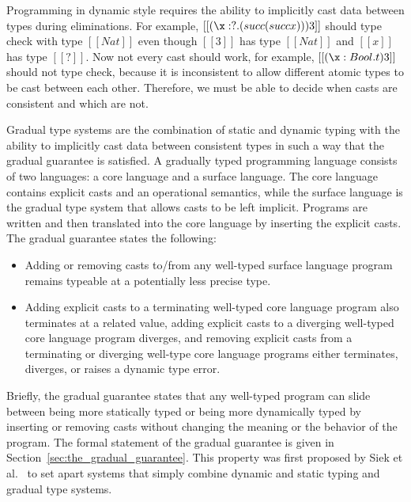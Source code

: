Programming in dynamic style requires the ability to implicitly cast
data between types during eliminations. For example, $[[(\x:?.(succ
    (succ x))) 3]]$ should type check with type $[[Nat]]$ even though
$[[3]]$ has type $[[Nat]]$ and $[[x]]$ has type $[[?]]$. Now not every
cast should work, for example, $[[(\x:Bool.t) 3]]$ should not type check,
because it is inconsistent to allow different atomic types to be cast
between each other.  Therefore, we must be able to decide when casts
are consistent and which are not.

Gradual type systems are the combination of static and dynamic typing
with the ability to implicitly cast data between consistent types in
such a way that the gradual guarantee is satisfied.  A gradually typed
programming language consists of two languages: a core language and a
surface language.  The core language contains explicit casts and an
operational semantics, while the surface language is the gradual type
system that allows casts to be left implicit.  Programs are written
and then translated into the core language by inserting the explicit
casts.  The gradual guarantee states the following:
\begin{itemize}
\item Adding or removing casts to/from any well-typed surface language
  program remains typeable at a potentially less precise type.
\item Adding explicit casts to a terminating well-typed core language
  program also terminates at a related value, adding explicit casts to
  a diverging well-typed core language program diverges, and removing
  explicit casts from a terminating or diverging well-type core
  language programs either terminates, diverges, or raises a dynamic
  type error.
\end{itemize}
Briefly, the gradual guarantee states that any well-typed program can
slide between being more statically typed or being more dynamically
typed by inserting or removing casts without changing the meaning or
the behavior of the program. The formal statement of the gradual
guarantee is given in Section~\ref{sec:the_gradual_guarantee}.  This
property was first proposed by Siek et al.~\cite{Siek:2015} to set
apart systems that simply combine dynamic and static typing and
gradual type systems.

